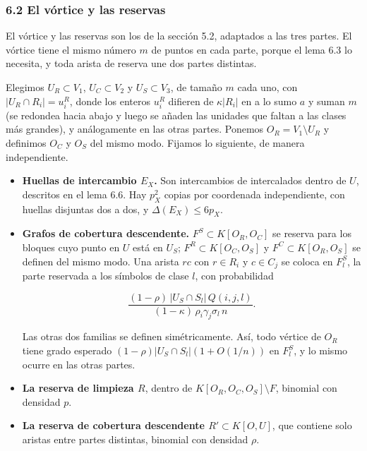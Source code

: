 \documentclass[spanish,11pt,a4paper]{article}
\begin{document}
\subsubsection{6.2 El vórtice y las reservas}\label{el-vuxf3rtice-y-las-reservas-1}

El vórtice y las reservas son los de la sección 5.2, adaptados a las tres partes. El vórtice tiene el mismo número \(m\) de puntos en cada parte, porque el lema 6.3 lo necesita, y toda arista de reserva une dos partes distintas.

Elegimos \(U_R\subset V_1\), \(U_C\subset V_2\) y \(U_S\subset V_3\), de tamaño \(m\) cada uno, con \(|U_R\cap R_i|=u^R_i\), donde los enteros \(u^R_i\) difieren de \(\kappa|R_i|\) en a lo sumo \(a\) y suman \(m\) (se redondea hacia abajo y luego se añaden las unidades que faltan a las clases más grandes), y análogamente en las otras partes. Ponemos \(O_R=V_1\setminus U_R\) y definimos \(O_C\) y \(O_S\) del mismo modo. Fijamos lo siguiente, de manera independiente.

\begin{itemize}
\item
  \textbf{Huellas de intercambio \(E_X\).} Son intercambios de intercalados dentro de \(U\), descritos en el lema 6.6. Hay \(p_X^2\) copias por coordenada independiente, con huellas disjuntas dos a dos, y \(\Delta(E_X)\le 6p_X\).
\item
  \textbf{Grafos de cobertura descendente.} \(F^S\subset K[O_R,O_C]\) se reserva para los bloques cuyo punto en \(U\) está en \(U_S\); \(F^R\subset K[O_C,O_S]\) y \(F^C\subset K[O_R,O_S]\) se definen del mismo modo. Una arista \(rc\) con \(r\in R_i\) y \(c\in C_j\) se coloca en \(F^S_l\), la parte reservada a los símbolos de clase \(l\), con probabilidad

  \[\frac{(1-\rho)\,|U_S\cap S_l|\,Q(i,j,l)}{(1-\kappa)\,\rho_i\gamma_j\sigma_l\,n}.\]

  Las otras dos familias se definen simétricamente. Así, todo vértice de \(O_R\) tiene grado esperado \((1-\rho)|U_S\cap S_l|(1+O(1/n))\) en \(F^S_l\), y lo mismo ocurre en las otras partes.
\item
  \textbf{La reserva de limpieza \(R\)}, dentro de \(K[O_R,O_C,O_S]\setminus F\), binomial con densidad \(p\).
\item
  \textbf{La reserva de cobertura descendente \(R'\subset K[O,U]\)}, que contiene solo aristas entre partes distintas, binomial con densidad \(\rho\).
\end{itemize}
\end{document}
